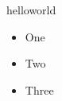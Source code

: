 \documentclass{article}
\begin{document}
helloworld\\

\begin{itemize}[label=$\ast$]
	\item One
    \item Two
    \item Three
\end{itemize}


% 
\end{document}

